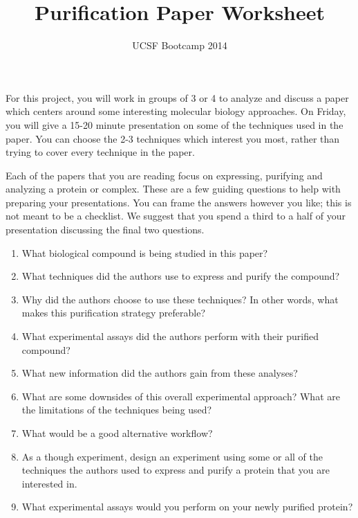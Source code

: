 \documentclass[twoside]{article}
\begin{document}
  \title{Purification Paper Worksheet} \author{UCSF Bootcamp 2014}
  \maketitle
  For this project, you will work in groups of 3 or 4 to analyze and discuss a paper which centers around some interesting molecular biology approaches. On Friday, you will give a 15-20 minute presentation on some of the techniques used in the paper. You can choose the 2-3 techniques which interest you most, rather than trying to cover every technique in the paper.

  Each of the papers that you are reading focus on expressing, purifying and analyzing a protein or complex. These are a few guiding questions to help with preparing your presentations. You can frame the answers however you like; this is not meant to be a checklist. We suggest that you spend a third to a half of your presentation discussing the final two questions.
  \begin{enumerate}
    
    \item What biological compound is being studied in this paper?
    \item What techniques did the authors use to express and purify the compound?
    \item Why did the authors choose to use these techniques? In other words, what makes this purification strategy preferable? 
    \item What experimental assays did the authors perform with their purified compound?
    \item What new information did the authors gain from these analyses?
    \item What are some downsides of this overall experimental approach? What are the limitations of the techniques being used?
    \item What would be a good alternative workflow?
    \item As a though experiment, design an experiment using some or all of the techniques the authors used to express and purify a protein that you are interested in.
    \item What experimental assays would you perform on your newly purified protein?

  \end{enumerate}
\end{document}
